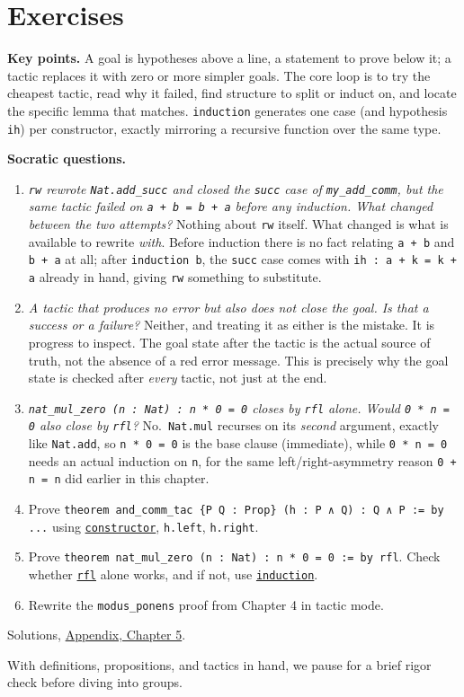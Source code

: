 \section{Exercises}\label{sec:05-tactics:06-exercises:1}

\textbf{Key points.} A goal is hypotheses above a line, a statement to prove below it; a tactic replaces it with zero or more simpler goals. The core loop is to try the cheapest tactic, read why it failed, find structure to split or induct on, and locate the specific lemma that matches. \texttt{induction} generates one case (and hypothesis \texttt{ih}) per constructor, exactly mirroring a recursive function over the same type.

\textbf{Socratic questions.}

\begin{enumerate}
\def\labelenumi{\arabic{enumi}.}
\item
  \emph{\texttt{rw} rewrote \texttt{Nat.add\_\allowbreak{}succ} and closed the \texttt{succ} case of \texttt{my\_\allowbreak{}add\_\allowbreak{}comm}, but the same tactic failed on \texttt{a + b = b + a} before any induction. What changed between the two attempts?} Nothing about \texttt{rw} itself. What changed is what is available to rewrite \emph{with}. Before induction there is no fact relating \texttt{a + b} and \texttt{b + a} at all; after \texttt{induction b}, the \texttt{succ} case comes with \texttt{ih : a + k = k + a} already in hand, giving \texttt{rw} something to substitute.
\item
  \emph{A tactic that produces no error but also does not close the goal. Is that a success or a failure?} Neither, and treating it as either is the mistake. It is progress to inspect. The goal state after the tactic is the actual source of truth, not the absence of a red error message. This is precisely why the goal state is checked after \emph{every} tactic, not just at the end.
\item
  \emph{\texttt{nat\_\allowbreak{}mul\_\allowbreak{}zero (n : Nat) : n * 0 = 0} closes by \texttt{rfl} alone. Would \texttt{0 * n = 0} also close by \texttt{rfl}?} No.~\texttt{Nat.mul} recurses on its \emph{second} argument, exactly like \texttt{Nat.add}, so \texttt{n * 0 = 0} is the base clause (immediate), while \texttt{0 * n = 0} needs an actual induction on \texttt{n}, for the same left/right-asymmetry reason \texttt{0 + n = n} did earlier in this chapter.
\item
  Prove \texttt{theorem and\_\allowbreak{}comm\_\allowbreak{}tac \{P Q : Prop\} (h : P ∧ Q) : Q ∧ P := by ...} using \href{https://lean-lang.org/doc/reference/latest/Tactic-Proofs/Tactic-Reference/}{\texttt{constructor}}, \texttt{h.left}, \texttt{h.right}.
\item
  Prove \texttt{theorem nat\_\allowbreak{}mul\_\allowbreak{}zero (n : Nat) : n * 0 = 0 := by rfl}. Check whether \href{https://lean-lang.org/doc/reference/latest/Tactic-Proofs/Tactic-Reference/}{\texttt{rfl}} alone works, and if not, use \href{https://lean-lang.org/doc/reference/latest/Tactic-Proofs/Tactic-Reference/}{\texttt{induction}}.
\item
  Rewrite the \texttt{modus\_\allowbreak{}ponens} proof from Chapter 4 in tactic mode.
\end{enumerate}

Solutions, \hyperref[sec:15-appendix-solutions:05-chapter-5:1]{Appendix, Chapter 5}.

With definitions, propositions, and tactics in hand, we pause for a brief rigor check before diving into groups.
